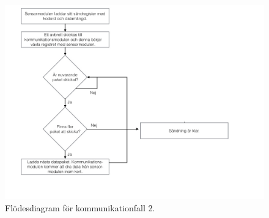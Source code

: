 \documentclass[a4paper,12pt,fleqn]{article}
\begin{document}
\begin{figure}[htp] %
  \begin{center}
  \includegraphics[keepaspectratio=true,width=\linewidth]{bilder/SPIbild003.jpg}  %
  \end{center}
  \caption{Flödesdiagram för kommunikationfall 2.} %
  \label{fig:case2flow}
\end{figure}
\end{document}
